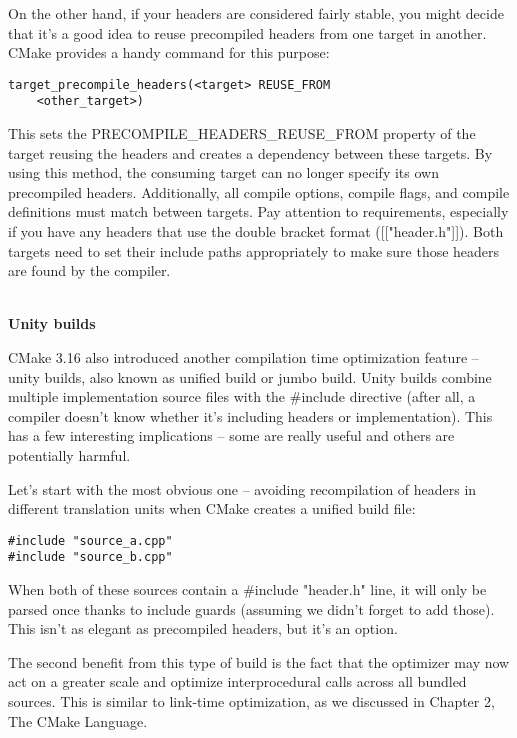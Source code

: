 On the other hand, if your headers are considered fairly stable, you might decide that it's a good idea to reuse precompiled headers from one target in another. CMake provides a handy command for this purpose:

\begin{lstlisting}[style=styleCMake]
target_precompile_headers(<target> REUSE_FROM
	<other_target>)
\end{lstlisting}

This sets the PRECOMPILE\_HEADERS\_REUSE\_FROM property of the target reusing the headers and creates a dependency between these targets. By using this method, the consuming target can no longer specify its own precompiled headers. Additionally, all compile options, compile flags, and compile definitions must match between targets. Pay attention to requirements, especially if you have any headers that use the double bracket format ([["header.h"]]). Both targets need to set their include paths appropriately to make sure those headers are found by the compiler.

\hspace*{\fill} \\ %
\noindent
\textbf{Unity builds}

CMake 3.16 also introduced another compilation time optimization feature – unity builds, also known as unified build or jumbo build. Unity builds combine multiple implementation source files with the \#include directive (after all, a compiler doesn't know whether it's including headers or implementation). This has a few interesting implications – some are really useful and others are potentially harmful.

Let's start with the most obvious one – avoiding recompilation of headers in different translation units when CMake creates a unified build file:

\begin{lstlisting}[style=styleCXX]
#include "source_a.cpp"
#include "source_b.cpp"
\end{lstlisting}

When both of these sources contain a \#include "header.h" line, it will only be parsed once thanks to include guards (assuming we didn't forget to add those). This isn't as elegant as precompiled headers, but it's an option.

The second benefit from this type of build is the fact that the optimizer may now act on a greater scale and optimize interprocedural calls across all bundled sources. This is similar to link-time optimization, as we discussed in Chapter 2, The CMake Language.

